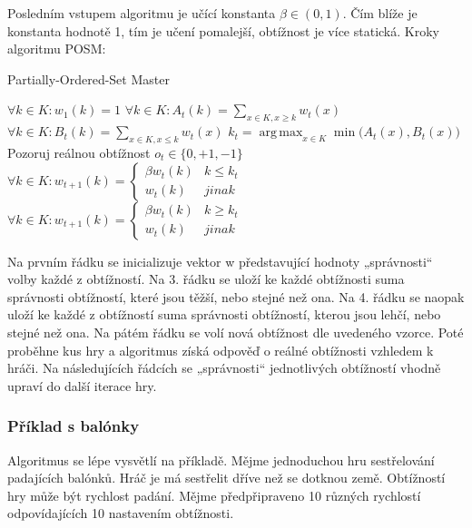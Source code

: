 Posledním vstupem algoritmu je učící konstanta $\beta\in(0,1)$. Čím blíže je konstanta hodnotě 1, tím je učení pomalejší, obtížnost je více statická.
Kroky algoritmu POSM:

\begin{algorithm}
\caption{Partially-Ordered-Set Master}
\label{posm}
\begin{algorithmic}[1]
\State $\forall k \in K : w_1(k) = 1$
	 \State $\forall k \in K : A_t(k) = \sum_{x \in K, x \geq k} w_t(x)$
	 \State $\forall k \in K : B_t(k) = \sum_{x \in K, x \leq k} w_t(x)$
	 \State $k_t = \operatorname{arg\,max}_{x \in K} \min({A_t(x), B_t(x))}$
	 \State Pozoruj reálnou obtížnost $o_t\in \{0,+1,-1\}$
	   \State $\forall k \in K : w_{t+1}(k) = 
		                                        \begin{cases}
																						   \beta w_t(k) & k \leq k_t \\
																							 w_t(k) & jinak
																						\end{cases}
						 $
   \EndIf
	   \State $\forall k \in K : w_{t+1}(k) = 
		                                        \begin{cases}
																						   \beta w_t(k) & k \geq k_t \\
																							 w_t(k) & jinak
																						\end{cases}
						 $
   \EndIf
\EndFor
\end{algorithmic}
\end{algorithm}

Na prvním řádku se inicializuje vektor w představující hodnoty „správnosti“ volby každé z obtížností. Na 3. řádku se uloží ke každé obtížnosti suma správnosti obtížností, které jsou těžší, nebo stejné než ona. Na 4. řádku se naopak uloží ke každé z obtížností suma správnosti obtížností, kterou jsou lehčí, nebo stejné než ona. Na pátém řádku se volí nová obtížnost dle uvedeného vzorce. Poté proběhne kus hry a algoritmus získá odpověď o reálné obtížnosti vzhledem k hráči. Na následujících řádcích se „správnosti“ jednotlivých obtížností vhodně upraví do další iterace hry.

\subsubsection{Příklad s balónky}

Algoritmus se lépe vysvětlí na příkladě.\cite{23posm2} Mějme jednoduchou hru sestřelování padajících balónků. Hráč je má sestřelit dříve než se dotknou země. Obtížností hry může být rychlost padání. Mějme předpřipraveno 10 různých rychlostí odpovídajících 10 nastavením obtížnosti.

